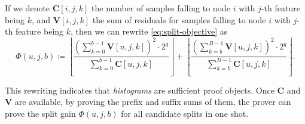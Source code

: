 If we denote $\mathbf{C}[i, j, k]$ the number of samples falling to node $i$ with $j$-th feature being $k$,
  and $\mathbf{V}[i, j, k]$ the sum of residuals for samples falling to node $i$ with $j$-th feature being $k$,
  then we can rewrite \eqref{eq:split-objective} as
\begin{equation}
\Phi(u,j,b)
\coloneqq
\left\lfloor\frac{\left(\sum_{k=0}^{b-1} \mathbf{V}[u, j, k]\right)^2\cdot 2^q}{\sum_{k=0}^{b-1} \mathbf{C}[u, j, k]}\right\rfloor
+
\left\lfloor\frac{\left(\sum_{k=b}^{B-1} \mathbf{V}[u, j, k]\right)^2\cdot 2^q}{\sum_{k=b}^{B-1} \mathbf{C}[u, j, k]}\right\rfloor.
\end{equation}

This rewriting indicates that \emph{histograms} are sufficient proof objects. 
Once $\mathbf{C}$ and $\mathbf{V}$ are available, by proving the prefix and suffix sums of them,
the prover can prove the split gain $\Phi(u,j,b)$ for all candidate splits in one shot.

